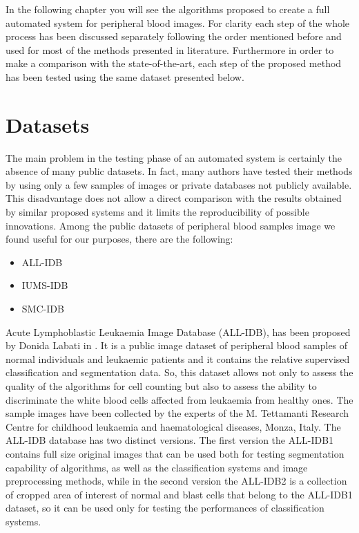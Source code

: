 \documentclass[final,a4paper,12pt,english]{UnicaPhdThesis3}
\begin{document}
In the following chapter you will see the algorithms proposed to create a full automated system for peripheral blood images. For clarity each step of the whole process has been discussed separately following the order mentioned before and used for most of the methods presented in literature. Furthermore in order to make a comparison with the state-of-the-art, each step of the proposed method has been tested using the same dataset presented below.

\section{Datasets}
The main problem in the testing phase ​of an automated system is certainly the absence of many public datasets. In fact, many authors have tested their methods by using only a few samples of images or private databases not publicly available. This disadvantage does not allow a direct comparison with the results obtained by similar proposed systems and it limits the reproducibility of possible innovations. Among the public datasets of peripheral blood samples image we found useful for our purposes, there are the following:
\begin{itemize}
	\item ALL-IDB \cite{Donida}
	\item IUMS-IDB \cite{Sarrafzadeh}
	\item SMC-IDB \cite{Mohamed}
\end{itemize} 
Acute Lymphoblastic Leukaemia Image Database (\acs{ALL-IDB}), has been proposed by Donida Labati in \cite{Donida}. It is a public image dataset of peripheral blood samples of normal individuals and leukaemic patients and it contains the relative supervised classification and segmentation data. So, this dataset allows not only to assess the quality of the algorithms for cell counting but also to assess the ability to discriminate the white blood cells affected from leukaemia from healthy ones. The sample images have been collected by the experts of the M. Tettamanti Research Centre for childhood leukaemia and haematological diseases, Monza, Italy. The ALL-IDB database has two distinct versions. The first version the ALL-IDB1 contains full size original images that can be used both for testing segmentation capability of algorithms, as well as the classification systems and image preprocessing methods, while in the second version the ALL-IDB2 is a collection of cropped area of interest of normal and blast cells that belong to the ALL-IDB1 dataset, so it can be used only for testing the performances of classification systems.
\end{document}
